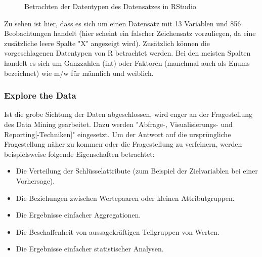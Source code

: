 \begin{figure}[H]
\centering
{}
\caption{Betrachten der Datentypen des Datensatzes in RStudio}
\label{fig:Lasagne_RStudio}
\end{figure}
Zu sehen ist hier, dass es sich um einen Datensatz mit 13 Variablen und 856 Beobachtungen handelt (hier scheint ein falscher Zeichensatz vorzuliegen, da eine zusätzliche leere Spalte "X" angezeigt wird). Zusätzlich können die vorgeschlagenen Datentypen von R betrachtet werden. Bei den meisten Spalten handelt es sich um Ganzzahlen (int) oder Faktoren (manchmal auch als Enums bezeichnet) wie m/w für männlich und weiblich.

\subsubsection{Explore the Data}
Ist die grobe Sichtung der Daten abgeschlossen, wird enger an der Fragestellung des Data Mining gearbeitet. Dazu werden "Abfrage-, Visualisierungs- und Reporting[-Techniken]"\citep[S.~16; eigene Übersetzung]{shearer_crisp-dm_2000} eingesetzt. Um der Antwort auf die ursprüngliche Fragestellung näher zu kommen oder die Fragestellung zu verfeinern, werden beispielsweise folgende Eigenschaften betrachtet\citep[S.~18; eigene Übersetzung]{chapman_crisp-dm_2000}:
\begin{itemize}
\item Die Verteilung der Schlüsselattribute (zum Beispiel der Zielvariablen bei einer Vorhersage).
\item Die Beziehungen zwischen Wertepaaren oder kleinen Attributgruppen.
\item Die Ergebnisse einfacher Aggregationen.
\item Die Beschaffenheit von aussagekräftigen Teilgruppen von Werten.
\item Die Ergebnisse einfacher statistischer Analysen.
\end{itemize}

